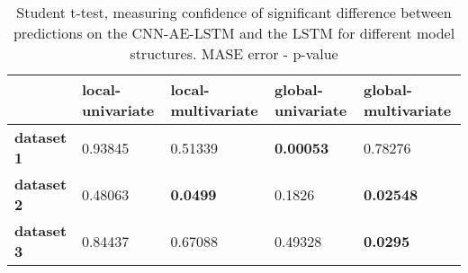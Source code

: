 \begin{table}[h]
\centering
\caption{Student t-test, measuring confidence of significant difference between predictions on the CNN-AE-LSTM and the LSTM for different model structures. MASE error - p-value}
\label{table:ttest-p-values-main-experiments-MASE}
\begin{tabular}{lllll}
\toprule
{} & local-univariate & local-multivariate & global-univariate & global-multivariate \\
\midrule
\textbf{dataset 1} &          0.93845 &            0.51339 &  \textbf{0.00053} &             0.78276 \\
\textbf{dataset 2} &          0.48063 &    \textbf{0.0499} &            0.1826 &    \textbf{0.02548} \\
\textbf{dataset 3} &          0.84437 &            0.67088 &           0.49328 &     \textbf{0.0295} \\
\bottomrule
\end{tabular}
\end{table}
